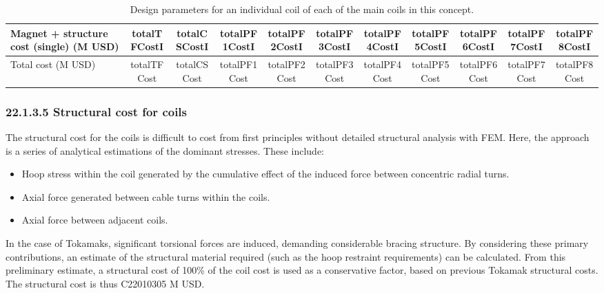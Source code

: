 \begin{table}[h]
{\begin{tabular}{lcccccccccc}
Magnet + structure cost (single) (M USD) & totalTFCostI & totalCSCostI & totalPF1CostI & totalPF2CostI & totalPF3CostI & totalPF4CostI & totalPF5CostI & totalPF6CostI & totalPF7CostI & totalPF8CostI \\
\hline
Total cost (M USD) & totalTFCost & totalCSCost & totalPF1Cost & totalPF2Cost & totalPF3Cost & totalPF4Cost & totalPF5Cost & totalPF6Cost & totalPF7Cost & totalPF8Cost \\
\hline
\end{tabular}}
\caption{Design parameters for an individual coil of each of the main coils in this concept.}
\label{your-table-label}
\end{table}


\subsubsection*{22.1.3.5 Structural cost for coils}

The structural cost for the coils is difficult to cost from first principles without detailed structural analysis with FEM. Here, the approach is a series of analytical estimations of the dominant stresses. These include:

\begin{itemize}
    \item Hoop stress within the coil generated by the cumulative effect of the induced force between concentric radial turns.
    \item Axial force generated between cable turns within the coils. 
    \item Axial force between adjacent coils.
\end{itemize}


In the case of Tokamaks, significant torsional forces are induced, demanding considerable bracing structure. By considering these primary contributions, an estimate of the structural material required (such as the hoop restraint requirements) can be calculated. From this preliminary estimate, a structural cost of 100\% of the coil cost is used as a conservative factor, based on previous Tokamak structural costs. The structural cost is thus C22010305 M USD.



